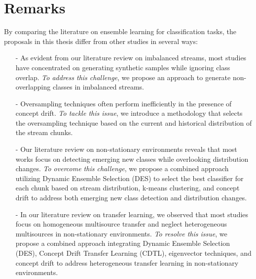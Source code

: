 \section{Remarks} 
\label{sec:3_7_remartks}

By comparing the literature on ensemble learning for classification tasks, the proposals in this thesis differ from other studies in several ways:

\begin{enumerate}
    
    \item [-] As evident from our literature review on imbalanced streams, most studies have concentrated on generating synthetic samples while ignoring class overlap. \textit{To address this challenge}, we propose an approach to generate non-overlapping classes in imbalanced streams.

    \item [-] Oversampling techniques often perform inefficiently in the presence of concept drift. \textit{To tackle this issue}, we introduce a methodology that selects the oversampling technique based on the current and historical distribution of the stream chunks.
    
    \item [-] Our literature review on non-stationary environments reveals that most works focus on detecting emerging new classes while overlooking distribution changes. \textit{To overcome this challenge}, we propose a combined approach utilizing Dynamic Ensemble Selection (DES) to select the best classifier for each chunk based on stream distribution, k-means clustering, and concept drift to address both emerging new class detection and distribution changes.
    
    \item [-] In our literature review on transfer learning, we observed that most studies focus on homogeneous multisource transfer and neglect heterogeneous multisources in non-stationary environments. \textit{To resolve this issue}, we propose a combined approach integrating Dynamic Ensemble Selection (DES), Concept Drift Transfer Learning (CDTL), eigenvector techniques, and concept drift to address heterogeneous transfer learning in non-stationary environments.

\end{enumerate}

